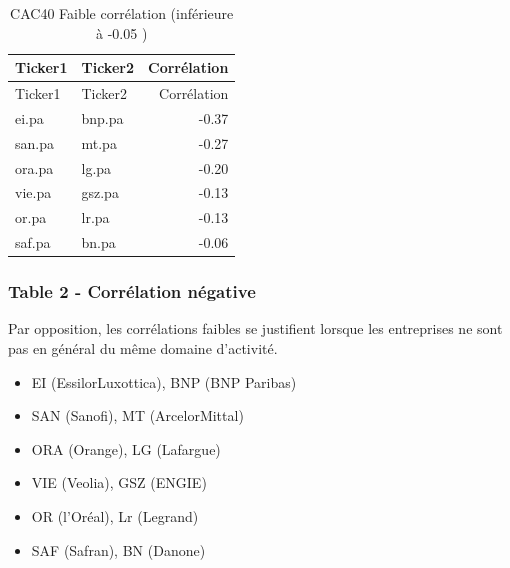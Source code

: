 \documentclass[
]{article}
\providecommand{\tightlist}{%
  \setlength{\itemsep}{0pt}\setlength{\parskip}{0pt}}
\begin{document}
\begin{longtable}[]{@{}llr@{}}
\caption{CAC40 Faible corrélation (inférieure à -0.05 )}\tabularnewline
\toprule
Ticker1 & Ticker2 & Corrélation\tabularnewline
\midrule
\endfirsthead
\toprule
Ticker1 & Ticker2 & Corrélation\tabularnewline
\midrule
\endhead
ei.pa & bnp.pa & -0.37\tabularnewline
san.pa & mt.pa & -0.27\tabularnewline
ora.pa & lg.pa & -0.20\tabularnewline
vie.pa & gsz.pa & -0.13\tabularnewline
or.pa & lr.pa & -0.13\tabularnewline
saf.pa & bn.pa & -0.06\tabularnewline
\bottomrule
\end{longtable}

\hypertarget{table-2---corruxe9lation-nuxe9gative}{%
\subsubsection{Table 2 - Corrélation
négative}\label{table-2---corruxe9lation-nuxe9gative}}

Par opposition, les corrélations faibles se justifient lorsque les
entreprises ne sont pas en général du même domaine d'activité.

\begin{itemize}
\tightlist
\item
  EI (EssilorLuxottica), BNP (BNP Paribas)
\item
  SAN (Sanofi), MT (ArcelorMittal)
\item
  ORA (Orange), LG (Lafargue)
\item
  VIE (Veolia), GSZ (ENGIE)
\item
  OR (l'Oréal), Lr (Legrand)
\item
  SAF (Safran), BN (Danone)
\end{itemize}
\end{document}
